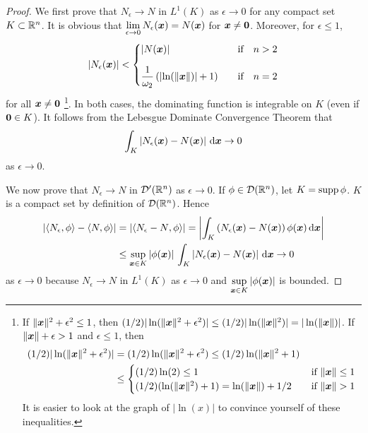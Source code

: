 \begin{proof}
We first prove that $N_\epsilon \rightarrow N$ in $L^1(K)$ as
$\epsilon \rightarrow 0$ for any compact set $K \subset \mathbb{R}^n$.
It is obvious that
$\displaystyle \lim_{\epsilon \rightarrow 0} N_\epsilon({\bm{x}}) = N({\bm{x}})$
for ${\bm{x}} \neq {\bm{0}}$.  Moreover, for $\epsilon \leq 1$,
\[
\left| N_\epsilon({\bm{x}}) \right| <
\begin{cases}
\displaystyle \left| N({\bm{x}})\right| & \quad \text{if} \quad n>2 \\[1em]
\displaystyle \frac{1}{\omega_2} \left( \left|\ln(\|{\bm{x}}\|)\right|+1 \right) 
& \quad \text{if} \quad n=2
\end{cases}
\]
for all ${\bm{x}} \neq {\bm{0}}$ \footnote{If
$\|{\bm{x}}\|^2+\epsilon^2 \leq 1$, then
$(1/2) |\ln(\|{\bm{x}}\|^2 + \epsilon^2)|  
\leq (1/2) |\ln(\|{\bm{x}}\|^2)| = |\ln(\|{\bm{x}}\|)|$.
If $\|{\bm{x}}\|+\epsilon > 1$ and $\epsilon\leq 1$, then
\begin{align*}
(1/2)|\ln(\|{\bm{x}}\|^2+\epsilon^2)|
&= (1/2)\ln(\|{\bm{x}}\|^2+\epsilon^2)
\leq (1/2)\ln(\|{\bm{x}}\|^2+1) \\
&\leq
\begin{cases}
(1/2) \ln(2) \leq 1 & \quad \text{if} \ \|{\bm{x}}\|\leq 1 \\
(1/2)(\ln(\|{\bm{x}}\|^2) + 1) = \ln(\|{\bm{x}}\|) + 1/2
& \quad \text{if} \ \|{\bm{x}}\| > 1
\end{cases}
\end{align*}
It is easier to look at the graph of $|\ln(x)|$ to convince yourself
of these inequalities.}.  In both cases, the dominating
function is integrable on $K$ (even if ${\bm{0}} \in  K$).
It follows from the Lebesgue Dominate Convergence Theorem that
\[
\int_K \left| N_\epsilon({\bm{x}}) - N({\bm{x}}) \right| \,\mathrm{d}{{\bm{x}}}
\rightarrow 0
\]
as $\epsilon \rightarrow 0$.

We now prove that $N_\epsilon \rightarrow N$ in $\mathcal{D}'(\mathbb{R}^n)$ as
$\epsilon \rightarrow 0$.  If $\phi \in \mathcal{D}(\mathbb{R}^n)$, let $K = \operatorname{supp} \phi$.
$K$ is a compact set by definition of $\mathcal{D}(\mathbb{R}^n)$.  Hence
\begin{align*}
\left| \left\langle{N_\epsilon} , {\phi}\right\rangle - \left\langle{N} , {\phi}\right\rangle \right|
&= \left| \left\langle{N_\epsilon - N} , {\phi}\right\rangle \right|
= \left| \int_K \left(N_\epsilon({\bm{x}}) - N({\bm{x}})\right)
\phi({\bm{x}}) \,\mathrm{d}{{\bm{x}}} \right| \\
&\leq  \sup_{{\bm{x}}\in K} \left|\phi({\bm{x}})\right| \,
\int_K \left|N_\epsilon({\bm{x}}) - N({\bm{x}})\right| \,\mathrm{d}{{\bm{x}}}
\rightarrow 0
\end{align*}
as $\epsilon \rightarrow 0$ because $N_\epsilon \rightarrow N$ in $L^1(K)$ as
$\epsilon \rightarrow 0$ and $\displaystyle
\sup_{{\bm{x}}\in K} \left|\phi({\bm{x}})\right|$ is bounded.


\end{proof}

